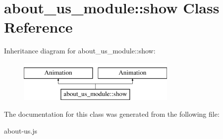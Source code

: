 \hypertarget{classabout__us__module_1_1show}{\section{about\-\_\-us\-\_\-module\-:\-:show Class Reference}
\label{classabout__us__module_1_1show}
}
Inheritance diagram for about\-\_\-us\-\_\-module\-:\-:show\-:\begin{figure}[H]
\begin{center}
\leavevmode
\includegraphics[height=2.000000cm]{classabout__us__module_1_1show}
\end{center}
\end{figure}


The documentation for this class was generated from the following file\-:\begin{DoxyCompactItemize}
\item 
about-\/us.\-js\end{DoxyCompactItemize}
